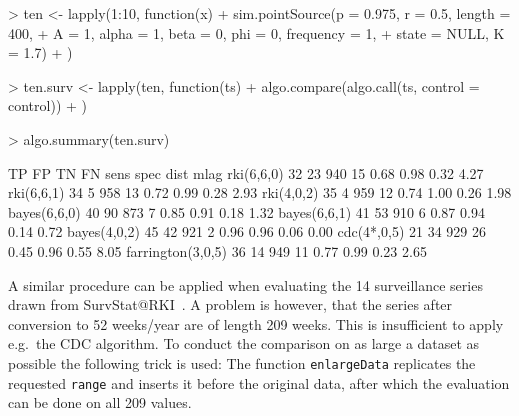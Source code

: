 \documentclass[a4paper,11pt]{article}
\begin{document}
\begin{Schunk}
\begin{Sinput}
> ten <- lapply(1:10, function(x) {
+     sim.pointSource(p = 0.975, r = 0.5, length = 400, 
+         A = 1, alpha = 1, beta = 0, phi = 0, frequency = 1, 
+         state = NULL, K = 1.7)
+ })
\end{Sinput}
\end{Schunk}
\begin{Schunk}
\begin{Sinput}
> ten.surv <- lapply(ten, function(ts) {
+     algo.compare(algo.call(ts, control = control))
+ })
\end{Sinput}
\end{Schunk}
\begin{Schunk}
\begin{Sinput}
> algo.summary(ten.surv)
\end{Sinput}
\end{Schunk}
\begin{Schunk}
\begin{Soutput}
                  TP FP  TN FN sens spec dist mlag
rki(6,6,0)        32 23 940 15 0.68 0.98 0.32 4.27
rki(6,6,1)        34  5 958 13 0.72 0.99 0.28 2.93
rki(4,0,2)        35  4 959 12 0.74 1.00 0.26 1.98
bayes(6,6,0)      40 90 873  7 0.85 0.91 0.18 1.32
bayes(6,6,1)      41 53 910  6 0.87 0.94 0.14 0.72
bayes(4,0,2)      45 42 921  2 0.96 0.96 0.06 0.00
cdc(4*,0,5)       21 34 929 26 0.45 0.96 0.55 8.05
farrington(3,0,5) 36 14 949 11 0.77 0.99 0.23 2.65
\end{Soutput}
\end{Schunk}

A similar procedure can be applied when evaluating the 14 surveillance
series drawn from SurvStat@RKI~\citep{survstat}. A problem is however,
that the series after conversion to 52 weeks/year are of length 209 weeks.
This is insufficient to apply e.g.\ the CDC algorithm. To conduct the
comparison on as large a dataset as possible the following trick is
used: The function \texttt{enlargeData} replicates the requested
\texttt{range} and inserts it before the original data, after which
the evaluation can be done on all 209 values.
\end{document}
